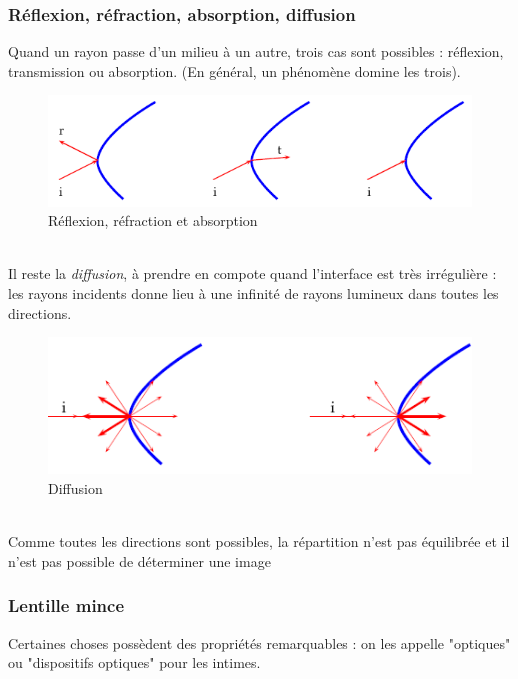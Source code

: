 \documentclass	[11pt, a4paper, openany]{book}
\begin{document}
\subsubsection*{Réflexion, réfraction, absorption, diffusion}
Quand un rayon passe d'un milieu à un autre, trois cas sont possibles : réflexion, transmission ou absorption. (En général, un phénomène domine les trois).\\
\begin{figure}[h]
\begin{center}
\includegraphics[scale=0.5]{labo/image26.png}
\end{center}
\caption{Réflexion, réfraction et absorption}
\label{rra}
\end{figure}\ \\
Il reste la \textit{diffusion}, à prendre en compote quand l'interface est très irrégulière : les rayons incidents donne lieu à une infinité de rayons lumineux dans toutes les directions.\\
\begin{figure}[h]
\begin{center}
\includegraphics[scale=0.5]{labo/image27.png}
\end{center}
\caption{Diffusion}
\label{diff}
\end{figure}\ \\
Comme toutes les directions sont possibles, la répartition n'est pas équilibrée et il n'est pas possible de déterminer une image

\subsubsection*{Lentille mince}
Certaines choses possèdent des propriétés remarquables : on les appelle "optiques" ou "dispositifs optiques" pour les intimes.\\
\end{document}
